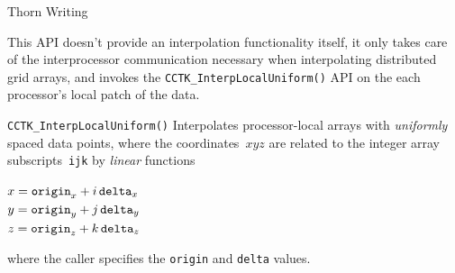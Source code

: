\begin{cactuspart}{Thorn Writing}
\begin{Lentry}
        This API doesn't provide an interpolation functionality itself,
        it only takes care of the interprocessor communication
        necessary when interpolating distributed grid arrays, and invokes
        the \texttt{CCTK\_InterpLocalUniform()} API on the each processor's
        local patch of the data.
\item[\texttt{CCTK\_InterpLocalUniform()}]
        Interpolates processor-local arrays with \emph{uniformly}
        spaced data points, \ie{} where the coordinates~$xyz$
        are related to the integer array subscripts~\verb|ijk| by
        \emph{linear} functions
        \begin{flushleft}
        $x = \mbox{\mbox{\texttt{origin}}}_x + i \, \mbox{\mbox{\texttt{delta}}}_x$ \\
        $y = \mbox{\mbox{\texttt{origin}}}_y + j \, \mbox{\mbox{\texttt{delta}}}_y$ \\
        $z = \mbox{\mbox{\texttt{origin}}}_z + k \, \mbox{\mbox{\texttt{delta}}}_z$ %
        \end{flushleft}
        where the caller specifies the \verb|origin| and \verb|delta|
        values.
\end{Lentry}


\end{cactuspart}
